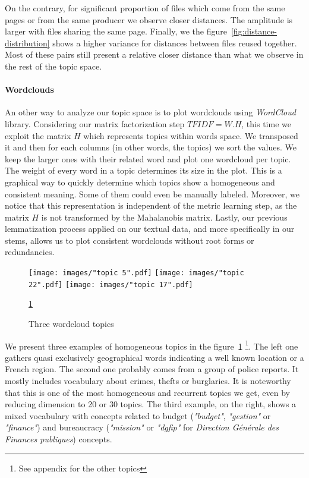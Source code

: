 \documentclass[a4paper]{article}
\begin{document}
	On the contrary, for significant proportion of files which come from the same pages or from the same producer we observe closer distances. The amplitude is larger with files sharing the same page. Finally, we the figure~\ref{fig:distance-distribution} shows a higher variance for distances between files reused together. Most of these pairs still present a relative closer distance than what we observe in the rest of the topic space.
	
	\paragraph{Wordclouds}
	
	An other way to analyze our topic space is to plot wordclouds using \emph{WordCloud} library. Considering our matrix factorization step $TFIDF = W.H$, this time we exploit the matrix $H$ which represents topics within words space. We transposed it and then for each columns (in other words, the topics) we sort the values. We keep the larger ones with their related word and plot one wordcloud per topic. The weight of every word in a topic determines its size in the plot. This is a graphical way to quickly determine which topics show a homogeneous and consistent meaning. Some of them could even be manually labeled. Moreover, we notice that this representation is independent of the metric learning step, as the matrix $H$ is not transformed by the Mahalanobis matrix. Lastly, our previous lemmatization process applied on our textual data, and more specifically in our stems, allows us to plot consistent wordclouds without root forms or redundancies.
	
	\begin{figure}[]
		\texttt{[image: images/"topic 5".pdf]}
		\label{fig:wc-region}
		\endminipage\hfill
		\texttt{[image: images/"topic 22".pdf]}
		\label{fig:wc-police}
		\endminipage\hfill
		\texttt{[image: images/"topic 17".pdf]}
		\label{fig:wc-budget}
		\endminipage
		\caption{Three wordcloud topics}
		\label{fig:wc}
		\ref{fig:wc}
	\end{figure}

	We present three examples of homogeneous topics in the figure~\ref{fig:wc} \footnote{See appendix for the other topics}. The left one gathers quasi exclusively geographical words indicating a well known location or a French region. The second one probably comes from a group of police reports. It mostly includes vocabulary about crimes, thefts or burglaries. It is noteworthy that this is one of the most homogeneous and recurrent topics we get, even by reducing dimension to 20 or 30 topics. The third example, on the right, shows a mixed vocabulary with concepts related to budget (\textit{"budget"}, \textit{"gestion"} or \textit{"finance"}) and bureaucracy (\textit{"mission"} or \textit{"dgfip"} for \textit{Direction Générale des Finances publiques}) concepts.
\end{document}
